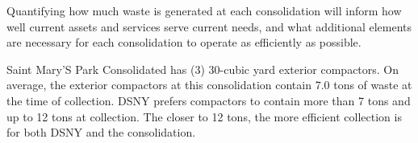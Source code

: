 
    Quantifying how much waste is generated at each consolidation will inform how well current assets and services serve current needs, and what additional elements are necessary for each consolidation to operate as efficiently as possible.
    
    Saint Mary'S Park Consolidated has (3) 30-cubic yard exterior compactors. On average, the exterior compactors at this consolidation contain 7.0 tons of waste at the time of collection. DSNY prefers compactors to contain more than 7 tons and up to 12 tons at collection. The closer to 12 tons, the more efficient collection is for both DSNY and the consolidation.